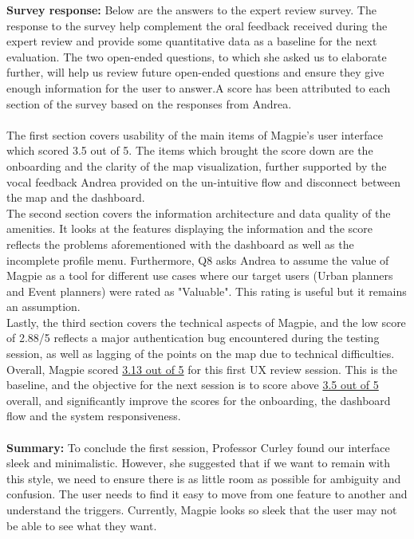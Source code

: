 \textbf{Survey response: }
Below are the answers to the expert review survey. The response to the survey help complement the oral feedback received during the expert review and provide some quantitative data as a baseline for the next evaluation. The two open-ended questions, to which she asked us to elaborate further, will help us review future open-ended questions and ensure they give enough information for the user to answer.A score has been attributed to each section of the survey based on the responses from Andrea.\\\\
The first section covers usability of the main items of Magpie's user interface which scored 3.5 out of 5. The items which brought the score down are the onboarding and the clarity of the map visualization, further supported by the vocal feedback Andrea provided on the un-intuitive flow and disconnect between the map and the dashboard.\\
The second section covers the information architecture and data quality of the amenities. It looks at the features displaying the information and the score reflects the problems aforementioned with the dashboard as well as the incomplete profile menu. Furthermore, Q8 asks Andrea to assume the value of Magpie as a tool for different use cases where our target users (Urban planners and Event planners) were rated as "Valuable". This rating is useful but it remains an assumption.\\
Lastly, the third section covers the technical aspects of Magpie, and the low score of 2.88/5 reflects a major authentication bug encountered during the testing session, as well as lagging of the points on the map due to technical difficulties.\\
Overall, Magpie scored \underline{3.13 out of 5} for this first UX review session. This is the baseline, and the objective for the next session is to score above \underline{3.5 out of 5} overall, and significantly improve the scores for the onboarding, the dashboard flow and the system responsiveness.\\\\
\textbf{Summary: }
To conclude the first session, Professor Curley found our interface sleek and minimalistic. However, she suggested that if we want to remain with this style, we need to ensure there is as little room as possible for ambiguity and confusion. The user needs to find it easy to move from one feature to another and understand the triggers. Currently, Magpie looks so sleek that the user may not be able to see what they want.
